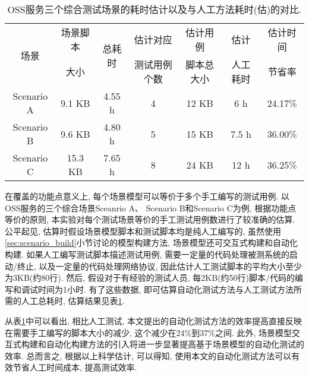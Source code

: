             \begin{table}[!htb]
                \centering
                \small
                \begin{tabular}{ccc|ccc|c}
                    \toprule
                    \multirow{2}{*}{场景} & 场景脚本 & \multirow{2}{*}{总耗时} & 估计对应     & 估计用例   & 估计     & 估计时间  \\
                                          & 大小     &                         & 测试用例个数 & 脚本总大小 & 人工耗时 & 节省率 \\
                    \midrule
                    Scenario A & 9.1 KB & 4.55 h & 4 & 12 KB & 6 h & 24.17\% \\
                    Scenario B & 9.6 KB & 4.80 h & 5 & 15 KB & 7.5 h & 36.00\% \\
                    Scenario C & 15.3 KB & 7.65 h & 8 & 24 KB & 12 h & 36.25\% \\
                    \bottomrule
                \end{tabular}
                \caption{OSS服务三个综合测试场景的耗时估计以及与人工方法耗时(估)的对比.}
                \label{tab:efficiency_esti}
            \end{table}
            
            在覆盖的功能点意义上, 每个场景模型可以等价于多个手工编写的测试用例. 以OSS服务的三个综合场景Sceanrio A、 Scenario B和Scenario C为例, 根据功能点等价的原则, 本实验对每个测试场景等价的手工测试用例数进行了较准确的估算. 公平起见, 估算时假设场景模型脚本和测试脚本均是纯人工编写的, 虽然使用\ref{sec:scenario_build}小节讨论的模型构建方法, 场景模型还可交互式构建和自动化构建. 如果人工编写测试脚本描述测试用例, 需要一定量的代码处理被测系统的启动/终止, 以及一定量的代码处理网络协议, 因此估计人工测试脚本的平均大小至少为3KB(约80行). 然后, 假设对于有经验的测试人员, 每2KB(约50行)脚本/代码的编写和调试时间为1小时. 有了这些数据, 即可估算自动化测试方法与人工测试方法所需的人工总耗时, 估算结果见表\ref{tab:efficiency_esti}.
            
            从表\ref{tab:efficiency_esti}中可以看出, 相比人工测试, 本文提出的自动化测试方法的效率提高直接反映在需要手工编写的脚本大小的减少, 这个减少在24\%到37\%之间. 此外, 场景模型交互式构建和自动化构建方法的引入将进一步显著提高基于场景模型的自动化测试的效率. 总而言之, 根据以上科学估计, 可以得知, 使用本文的自动化测试方法可以有效节省人工时间成本, 提高测试效率.
